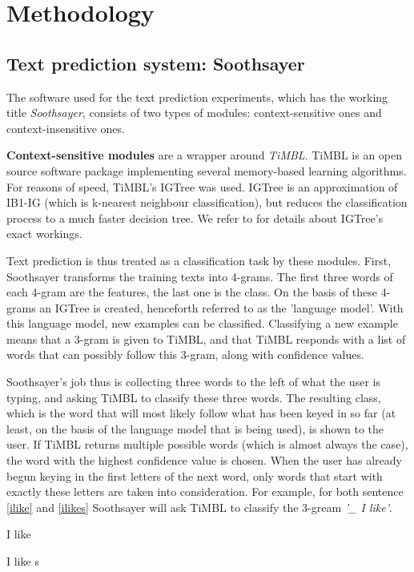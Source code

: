 \documentclass[11pt]{article}
\begin{document}
\section{Methodology}

\subsection{Text prediction system: Soothsayer}

The software used for the text prediction experiments, which has the working title \emph{Soothsayer}, consists of two types of modules: context-sensitive ones and context-insensitive ones. 

\textbf{Context-sensitive modules} are a wrapper around \emph{TiMBL}. TiMBL is an open source software package implementing several memory-based learning algorithms. For reasons of speed, TiMBL's IGTree was used. IGTree is an approximation of IB1-IG (which is k-nearest neighbour classification), but reduces the classification process to a much faster decision tree. We refer to  for details about IGTree's exact workings.

Text prediction is thus treated as a classification task by these modules. First, Soothsayer transforms the training texts into 4-grams. The first three words of each 4-gram are the features, the last one is the class. On the basis of these 4-grams an IGTree is created, henceforth referred to as the 'language model'. With this language model, new examples can be classified. Classifying a new example means that a 3-gram is given to TiMBL, and that TiMBL responds with a list of words that can possibly follow this 3-gram, along with confidence values. 

Soothsayer's job thus is collecting three words to the left of what the user is typing, and asking TiMBL to classify these three words. The resulting class, which is the word that will most likely follow what has been keyed in so far (at least, on the basis of the language model that is being used), is shown to the user. If TiMBL returns multiple possible words (which is almost always the case), the word with the highest confidence value is chosen. When the user has already begun keying in the first letters of the next word, only words that start with exactly these letters are taken into consideration. For example, for both sentence \ref{ilike} and \ref{ilikes} Soothsayer will ask TiMBL to classify the 3-gream \emph{'\_ I like'}.

\begin{examples}
\item I like \label{ilike}
\item I like s \label{ilikes}
\end{examples}
\end{document}

